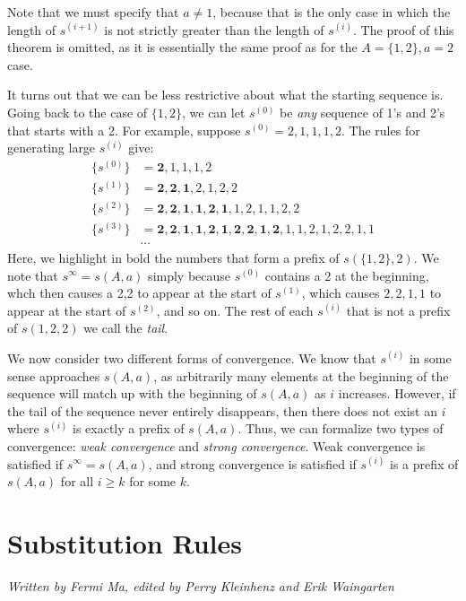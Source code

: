 \documentclass[runningheads,a4paper]{llncs}
\begin{document}
Note that we must specify that $a \neq 1$, because that is the only case in which the length of $s^{(i+1)}$ is not strictly greater than the length of $s^{(i)}$. The proof of this theorem is omitted, as it is essentially the same proof as for the $A = \{1,2\}, a = 2$ case.

It turns out that we can be less restrictive about what the starting sequence is. Going back to the case of $\{1,2\}$, we can let $s^{(0)}$ be \emph{any} sequence of 1's and 2's that starts with a 2. For example, suppose $s^{(0)} = 2,1,1,1,2$. The rules for generating large $s^{(i)}$ give:
\begin{align*}
\{s^{(0)}\} &= \mathbf{2},1,1,1,2\\
\{s^{(1)}\} &= \mathbf{2,2,1},2,1,2,2\\
\{s^{(2)}\} &= \mathbf{2,2,1,1,2,1},1,2,1,1,2,2\\
\{s^{(3)}\} &= \mathbf{2,2,1,1,2,1,2,2,1,2},1,1,2,1,2,2,1,1\\
&\cdots
\end{align*}
Here, we highlight in bold the numbers that form a prefix of $s(\{1,2\},2)$. We note that $s^\infty = s(A,a)$ simply because $s^{(0)}$ contains a 2 at the beginning, whch then causes a 2,2 to appear at the start of $s^{(1)}$, which causes $2,2,1,1$ to appear at the start of $s^{(2)}$, and so on. The rest of each $s^{(i)}$ that is not a prefix of $s({1,2},2)$ we call the \emph{tail}.

We now consider two different forms of convergence. We know that $s^{(i)}$ in some sense approaches $s(A,a)$, as arbitrarily many elements at the beginning of the sequence will match up with the beginning of $s(A,a)$ as $i$ increases. However, if the tail of the sequence never entirely disappears, then there does not exist an $i$ where $s^{(i)}$ is exactly a prefix of $s(A,a)$. Thus, we can formalize two types of convergence: \emph{weak convergence} and \emph{strong convergence}. Weak convergence is satisfied if $s^\infty = s(A,a)$, and strong convergence is satisfied if $s^{(i)}$ is a prefix of $s(A,a)$ for all $i \geq k$ for some $k$.

\section{Substitution Rules}
\label{substitutionrules}

\emph{Written by Fermi Ma, edited by Perry Kleinhenz and Erik Waingarten}
\end{document}
